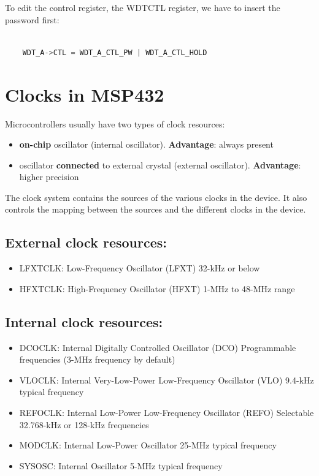 To edit the control register, the WDTCTL register, we have to insert the password first:


\begin{lstlisting}[language=c++]

    WDT_A->CTL = WDT_A_CTL_PW | WDT_A_CTL_HOLD
\end{lstlisting}

\section{Clocks in MSP432}

Microcontrollers usually have two types of clock resources:

\begin{itemize}
    \item \textbf{on-chip} oscillator (internal oscillator). \textbf{Advantage}: always present
    \item oscillator \textbf{connected} to external crystal (external oscillator). \textbf{Advantage}: higher precision
\end{itemize}

The clock system contains the sources of the various clocks in the device. It also controls the mapping
between the sources and the different clocks in the device.


\subsection{External clock resources:}

\begin{itemize}
    \item LFXTCLK: Low-Frequency Oscillator (LFXT) 32-kHz or below
    \item HFXTCLK: High-Frequency Oscillator (HFXT) 1-MHz to 48-MHz range
\end{itemize}

\subsection{Internal clock resources:}

\begin{itemize}
    \item DCOCLK: Internal Digitally Controlled Oscillator (DCO) Programmable frequencies (3-MHz frequency by default)
    \item VLOCLK: Internal Very-Low-Power Low-Frequency Oscillator (VLO) 9.4-kHz typical frequency
    \item REFOCLK: Internal Low-Power Low-Frequency Oscillator (REFO) Selectable 32.768-kHz or 128-kHz frequencies
    \item MODCLK: Internal Low-Power Oscillator 25-MHz typical frequency
    \item SYSOSC: Internal Oscillator 5-MHz typical frequency
\end{itemize}


